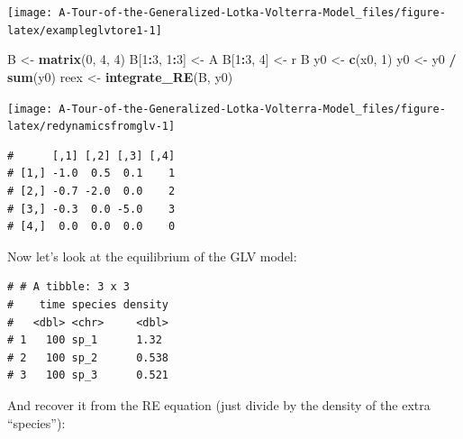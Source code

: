 \documentclass[
]{book}
\newenvironment{Shaded}{\begin{snugshade}}{\end{snugshade}}
\newcommand{\DecValTok}[1]{\textcolor[rgb]{0.00,0.00,0.81}{#1}}
\newcommand{\KeywordTok}[1]{\textcolor[rgb]{0.13,0.29,0.53}{\textbf{#1}}}
\newcommand{\NormalTok}[1]{#1}
\newcommand{\OperatorTok}[1]{\textcolor[rgb]{0.81,0.36,0.00}{\textbf{#1}}}
\newcommand{\StringTok}[1]{\textcolor[rgb]{0.31,0.60,0.02}{#1}}
\begin{document}
\begin{center}\texttt{[image: A-Tour-of-the-Generalized-Lotka-Volterra-Model\_files/figure-latex/exampleglvtore1-1]} \end{center}

\begin{Shaded}
\begin{Highlighting}[]
\NormalTok{B <-}\StringTok{ }\KeywordTok{matrix}\NormalTok{(}\DecValTok{0}\NormalTok{, }\DecValTok{4}\NormalTok{, }\DecValTok{4}\NormalTok{)}
\NormalTok{B[}\DecValTok{1}\OperatorTok{:}\DecValTok{3}\NormalTok{, }\DecValTok{1}\OperatorTok{:}\DecValTok{3}\NormalTok{] <-}\StringTok{ }\NormalTok{A}
\NormalTok{B[}\DecValTok{1}\OperatorTok{:}\DecValTok{3}\NormalTok{, }\DecValTok{4}\NormalTok{] <-}\StringTok{ }\NormalTok{r}
\NormalTok{B}
\NormalTok{y0 <-}\StringTok{ }\KeywordTok{c}\NormalTok{(x0, }\DecValTok{1}\NormalTok{)}
\NormalTok{y0 <-}\StringTok{ }\NormalTok{y0 }\OperatorTok{/}\StringTok{ }\KeywordTok{sum}\NormalTok{(y0)}
\NormalTok{reex <-}\StringTok{ }\KeywordTok{integrate_RE}\NormalTok{(B, y0)}
\end{Highlighting}
\end{Shaded}

\begin{center}\texttt{[image: A-Tour-of-the-Generalized-Lotka-Volterra-Model\_files/figure-latex/redynamicsfromglv-1]} \end{center}

\begin{verbatim}
#      [,1] [,2] [,3] [,4]
# [1,] -1.0  0.5  0.1    1
# [2,] -0.7 -2.0  0.0    2
# [3,] -0.3  0.0 -5.0    3
# [4,]  0.0  0.0  0.0    0
\end{verbatim}

Now let's look at the equilibrium of the GLV model:

\begin{Shaded}
\end{Shaded}

\begin{verbatim}
# # A tibble: 3 x 3
#    time species density
#   <dbl> <chr>     <dbl>
# 1   100 sp_1      1.32 
# 2   100 sp_2      0.538
# 3   100 sp_3      0.521
\end{verbatim}

And recover it from the RE equation (just divide by the density of the extra ``species''):
\end{document}

